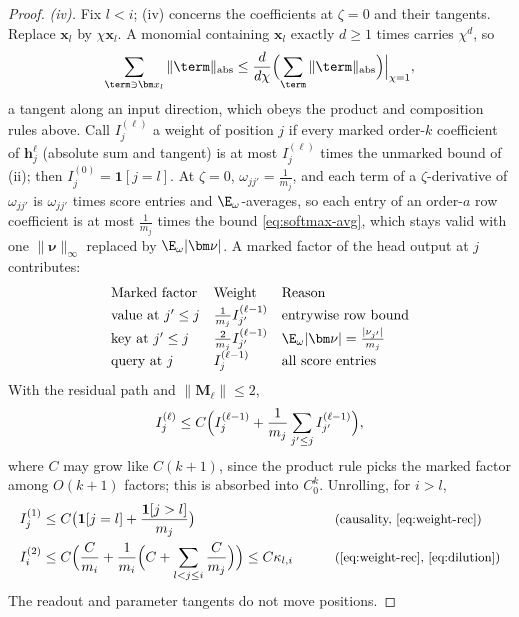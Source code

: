 \begin{proof}
\emph{(iv).} Fix $l<i$; (iv) concerns the coefficients at $\zeta=0$ and their tangents. Replace $\bm x_l$ by $\chi\bm x_l$. A monomial containing $\bm x_l$
exactly $d\ge1$ times carries $\chi^d$, so
\[
 \sum_{\term\ni\bm x_l}\|\term\|_{\mathrm{abs}}\le\frac{d}{d\chi}\Bigl(\sum_{\term}\|\term\|_{\mathrm{abs}}\Bigr)\Big|_{\chi=1},
\]
a tangent along an input direction, which obeys the product and composition rules above. Call $I^{(\ell)}_j$ a weight of position $j$ if every
marked order-$k$ coefficient of $\bm h^\ell_j$ (absolute sum and tangent) is at most $I^{(\ell)}_j$ times the unmarked bound of (ii); then
$I^{(0)}_j=\mathbf 1[j=l]$. At $\zeta=0$, $\omega_{jj'}=\frac{1}{m_j}$, and each term of a $\zeta$-derivative of $\omega_{jj'}$ is $\omega_{jj'}$ times score entries and
$\E_\omega$-averages, so each entry of an order-$a$ row coefficient is at most $\frac{1}{m_j}$ times the bound \cref{eq:softmax-avg}, which stays
valid with one $\|\bm\nu\|_\infty$ replaced by $\E_\omega|\bm\nu|$. A marked factor of the head output at $j$ contributes:
\[
\begin{array}{@{}lll@{}}
 \text{Marked factor} & \text{Weight} & \text{Reason}\\[2pt]
 \text{value at }j'\le j & \frac{1}{m_j}I^{(\ell-1)}_{j'} & \text{entrywise row bound}\\[2pt]
 \text{key at }j'\le j & \frac{2}{m_j}I^{(\ell-1)}_{j'} & \E_\omega|\bm\nu|=\frac{|\nu_{j'}|}{m_j}\\[2pt]
 \text{query at }j & I^{(\ell-1)}_j & \text{all score entries}
\end{array}
\]
With the residual path and $\|\mathbf M_\ell\|\le2$,
\begin{equation}
 I^{(\ell)}_j\le C\Bigl(I^{(\ell-1)}_j+\frac{1}{m_j}\sum_{j'\le j}I^{(\ell-1)}_{j'}\Bigr),
 \label{eq:weight-rec}
\end{equation}
where $C$ may grow like $C(k+1)$, since the product rule picks the marked factor among $O(k+1)$ factors; this is absorbed into $C_0^k$.
Unrolling, for $i>l$,
\begin{alignat*}{2}
 I^{(1)}_j&\le C\bigl(\mathbf 1[j=l]+\frac{\mathbf 1[j>l]}{m_j}\bigr) &\qquad& \why{causality, \cref{eq:weight-rec}}\\
 I^{(2)}_i&\le C\Bigl(\frac{C}{m_i}+\frac{1}{m_i}\Bigl(C+\sum_{l<j\le i}\frac{C}{m_j}\Bigr)\Bigr)\le C\kappa_{l,i} && \why{\cref{eq:weight-rec}, \cref{eq:dilution}}
\end{alignat*}
The readout and parameter tangents do not move positions.
\end{proof}

